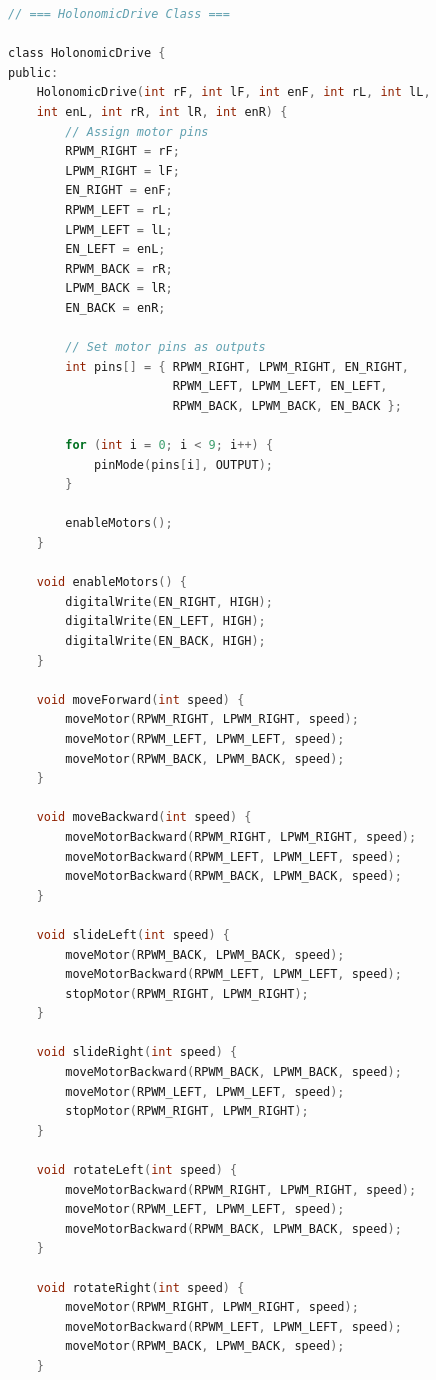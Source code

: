\documentclass{article}
\begin{document}
\begin{lstlisting}[language=C, basicstyle=\ttfamily\footnotesize, frame=single, xleftmargin=10mm, xrightmargin=10mm]
// === HolonomicDrive Class ===

class HolonomicDrive {
public:
    HolonomicDrive(int rF, int lF, int enF, int rL, int lL, 
    int enL, int rR, int lR, int enR) {
        // Assign motor pins
        RPWM_RIGHT = rF;
        LPWM_RIGHT = lF;
        EN_RIGHT = enF;
        RPWM_LEFT = rL;
        LPWM_LEFT = lL;
        EN_LEFT = enL;
        RPWM_BACK = rR;
        LPWM_BACK = lR;
        EN_BACK = enR;

        // Set motor pins as outputs
        int pins[] = { RPWM_RIGHT, LPWM_RIGHT, EN_RIGHT,
                       RPWM_LEFT, LPWM_LEFT, EN_LEFT,
                       RPWM_BACK, LPWM_BACK, EN_BACK };

        for (int i = 0; i < 9; i++) {
            pinMode(pins[i], OUTPUT);
        }

        enableMotors();
    }

    void enableMotors() {
        digitalWrite(EN_RIGHT, HIGH);
        digitalWrite(EN_LEFT, HIGH);
        digitalWrite(EN_BACK, HIGH);
    }

    void moveForward(int speed) {
        moveMotor(RPWM_RIGHT, LPWM_RIGHT, speed);
        moveMotor(RPWM_LEFT, LPWM_LEFT, speed);
        moveMotor(RPWM_BACK, LPWM_BACK, speed);
    }

    void moveBackward(int speed) {
        moveMotorBackward(RPWM_RIGHT, LPWM_RIGHT, speed);
        moveMotorBackward(RPWM_LEFT, LPWM_LEFT, speed);
        moveMotorBackward(RPWM_BACK, LPWM_BACK, speed);
    }

    void slideLeft(int speed) {
        moveMotor(RPWM_BACK, LPWM_BACK, speed);
        moveMotorBackward(RPWM_LEFT, LPWM_LEFT, speed);
        stopMotor(RPWM_RIGHT, LPWM_RIGHT);
    }

    void slideRight(int speed) {
        moveMotorBackward(RPWM_BACK, LPWM_BACK, speed);
        moveMotor(RPWM_LEFT, LPWM_LEFT, speed);
        stopMotor(RPWM_RIGHT, LPWM_RIGHT);
    }

    void rotateLeft(int speed) {
        moveMotorBackward(RPWM_RIGHT, LPWM_RIGHT, speed);
        moveMotor(RPWM_LEFT, LPWM_LEFT, speed);
        moveMotorBackward(RPWM_BACK, LPWM_BACK, speed);
    }

    void rotateRight(int speed) {
        moveMotor(RPWM_RIGHT, LPWM_RIGHT, speed);
        moveMotorBackward(RPWM_LEFT, LPWM_LEFT, speed);
        moveMotor(RPWM_BACK, LPWM_BACK, speed);
    }


\end{lstlisting}
\end{document}
